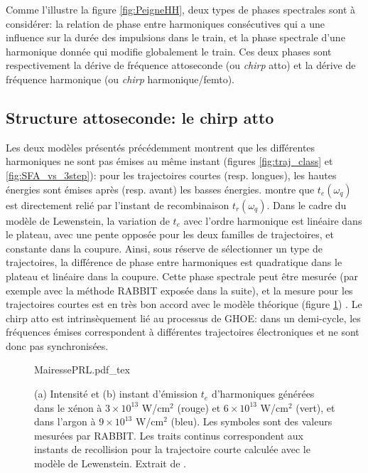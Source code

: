 Comme l'illustre la figure \ref{fig:PeigneHH}, deux types de phases spectrales sont à considérer: la relation de phase entre harmoniques consécutives qui a une influence sur la durée des impulsions dans le train, et la phase spectrale d'une harmonique donnée qui modifie globalement le train. Ces deux phases sont respectivement la dérive de fréquence attoseconde (ou \textit{chirp} atto) et la dérive de fréquence harmonique (ou \textit{chirp} harmonique/femto).

\subsection{Structure attoseconde: le chirp atto} 
Les deux modèles présentés précédemment montrent que les différentes harmoniques ne sont pas émises au même instant (figures \ref{fig:traj_class} et \ref{fig:SFA_vs_3step}): pour les trajectoires courtes (resp. longues), les hautes énergies sont émises après (resp. avant) les basses énergies.  montre que $t_e(\omega_q)$ est directement relié par l'instant de recombinaison $t_r(\omega_q)$. Dans le cadre du modèle de Lewenstein, la variation de $t_e$ avec l'ordre harmonique est linéaire dans le plateau, avec une pente opposée pour les deux familles de trajectoires, et constante dans la coupure. Ainsi, sous réserve de sélectionner un type de trajectoires, la différence de phase entre harmoniques est quadratique dans le plateau et linéaire dans la coupure. Cette phase spectrale peut être mesurée (par exemple avec la méthode RABBIT exposée dans la suite), et la mesure pour les trajectoires courtes est en très bon accord avec le modèle théorique (figure \ref{fig:MairessePRL}) . Le chirp atto est intrinsèquement lié au processus de GHOE: dans un demi-cycle, les fréquences émises correspondent à différentes trajectoires électroniques et ne sont donc pas synchronisées.  

\begin{figure}
\centering
\def\svgwidth{0.7\columnwidth}
{MairessePRL.pdf_tex}
\caption{(a) Intensité et (b) instant d'émission $t_e$ d'harmoniques générées dans le xénon à $3 \times 10^{13}$ W/cm$^2$ (rouge) et $6 \times 10^{13}$ W/cm$^2$ (vert), et dans l'argon à $9 \times 10^{13}$ W/cm$^2$ (bleu). Les symboles sont des valeurs mesurées par RABBIT. Les traits continus correspondent aux instants de recollision pour la trajectoire courte calculée avec le modèle de Lewenstein. Extrait de .}
\label{fig:MairessePRL}
\end{figure}

